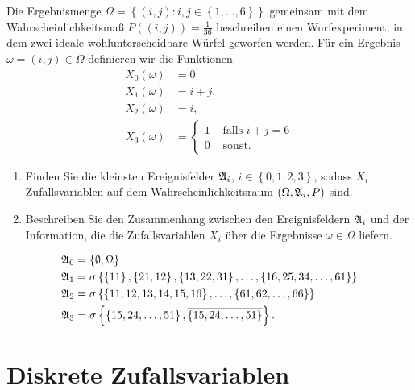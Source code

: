 Die Ergebnismenge
$\Omega = \left\{ (i,j) : i,j \in \left\{ 1,\dots ,6 \right\} \right\}$
gemeinsam mit dem Wahrscheinlichkeitsmaß $P( (i,j) ) = \frac{1}{36}$ beschreiben
einen Wurfexperiment, in dem zwei ideale wohlunterscheidbare Würfel geworfen
werden. 
Für ein Ergebnis $\omega = (i,j) \in \Omega$ definieren wir die Funktionen
\begin{align*}
    X_0(\omega) &= 0 \\
    X_1(\omega) &= i+j, \\
    X_2(\omega) &= i, \\
    X_3(\omega) &= 
    \begin{cases}
        1 & \text{ falls } i+j=6 \\
        0 & \text{ sonst.}
    \end{cases}
\end{align*}
\begin{enumerate}
    \item Finden Sie die kleinsten Ereignisfelder $\mathfrak A_{i}$, $i\in \left\{
        0,1,2,3 \right\}$, sodass $X_i$ Zufallsvariablen auf dem Wahrscheinlichkeitsraum
        $(\Omega, \mathfrak A_i, P)$ sind. 
    \item Beschreiben Sie den Zusammenhang zwischen den Ereignisfeldern $\mathfrak A_i$
        und der Information, die die Zufallsvariablen $X_i$ über die Ergebnisse
        $\omega \in \Omega$ liefern.
\end{enumerate}

\solution 
\begin{align*}
    \mathfrak A_0 &= \left\{ \emptyset, \Omega \right\} \\
    \mathfrak A_1 &= \sigma \left\{ \left\{ 11 \right\}, \left\{ 21,12 \right\}, \left\{ 13,22,31
    \right\},\dots , \left\{ 16,25,34,\dots ,61 \right\} \right\} \\
    \mathfrak A_2 &= \sigma \left\{ \left\{ 11,12,13,14,15,16 \right\},\dots ,\left\{ 61,62,\dots ,66
    \right\} \right\} \\
    \mathfrak A_3 &= \sigma \left\{ \left\{ 15,24,\dots ,51 \right\}, 
    \overline{ \left\{ 15,24,\dots ,51 \right\}  } \right\}.
\end{align*}


\section{Diskrete Zufallsvariablen}

